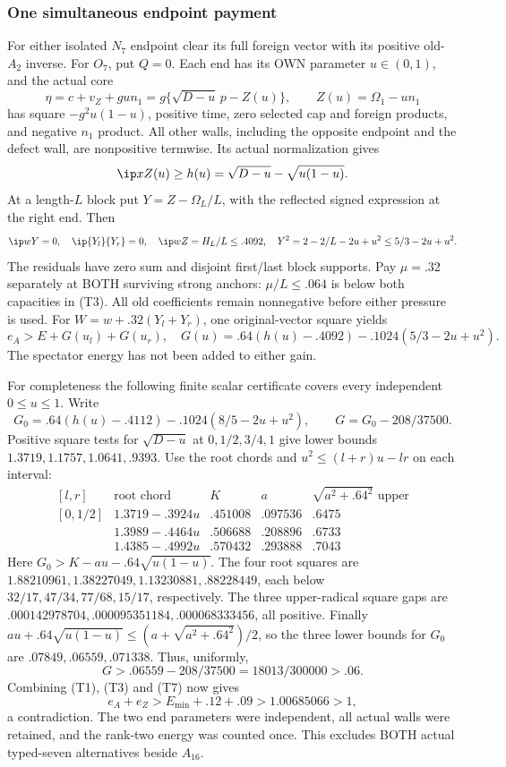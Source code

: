 \subsubsection{One simultaneous endpoint payment}
For either isolated \(N_7\) endpoint clear its full foreign vector
with its positive old-\(A_2\) inverse.  For \(O_7\), put \(Q=0\).
Each end has its OWN parameter \(u\in(0,1)\), and the actual core
\[
 \eta=c+v_Z+gu n_1
 =g\{\sqrt{D-u}\,p-Z(u)\},\qquad Z(u)=\Omega_1-u n_1
\]
has square \(-g^2u(1-u)\), positive time, zero selected cap and
foreign products, and negative \(n_1\) product.  All other walls,
including the opposite endpoint and the defect wall, are nonpositive
termwise.  Its actual normalization gives
\[
 \ip x{Z(u)}\ge h(u)=\sqrt{D-u}-\sqrt{u(1-u)}.
\]
At a length-\(L\) block put \(Y=Z-\Omega_L/L\), with the
reflected signed expression at the right end.  Then
\[
 \ip wY=0,\quad \ip{Y_l}{Y_r}=0,\quad
 \ip wZ=H_L/L\le.4092,\quad
 Y^2=2-2/L-2u+u^2\le5/3-2u+u^2.
\]
The residuals have zero sum and disjoint first/last block supports.
Pay \(\mu=.32\) separately at BOTH surviving strong anchors:
\(\mu/L\le.064\) is below both capacities in (T3).
All old coefficients remain nonnegative before either pressure is used.
For \(W=w+.32(Y_l+Y_r)\), one original-vector square yields
\[
 e_A>E+G(u_l)+G(u_r),\quad
 G(u)=.64(h(u)-.4092)-.1024(5/3-2u+u^2).            \tag{T7}
\]
The spectator energy has not been added to either gain.

For completeness the following finite scalar certificate covers every
independent \(0\le u\le1\).  Write
\[
 G_0=.64(h(u)-.4112)-.1024(8/5-2u+u^2),\qquad
 G=G_0-208/37500.
\]
Positive square tests for \(\sqrt{D-u}\) at \(0,1/2,3/4,1\)
give lower bounds \(1.3719,1.1757,1.0641,.9393\).
Use the root chords and \(u^2\le(l+r)u-lr\) on each interval:
\[
\begin{array}{c|c|c|c|c}
[l,r]&\text{root chord}&K&a&\sqrt{a^2+.64^2}\text{ upper}\\ \hline
[0,1/2]&1.3719-.3924u&.451008&.097536&.6475\\
[1/2,3/4]&1.3989-.4464u&.506688&.208896&.6733\\
[3/4,1]&1.4385-.4992u&.570432&.293888&.7043
\end{array}
\]
Here \(G_0>K-au-.64\sqrt{u(1-u)}\).
The four root squares are
\(1.88210961,1.38227049,1.13230881,.88228449\),
each below \(32/17,47/34,77/68,15/17\), respectively.
The three upper-radical square gaps are
\(.000142978704,.000095351184,.000068333456\), all positive.
Finally
\(au+.64\sqrt{u(1-u)}\le(a+\sqrt{a^2+.64^2})/2\),
so the three lower bounds for \(G_0\) are
\(.07849,.06559,.071338\).  Thus, uniformly,
\[
               G>.06559-208/37500=18013/300000>.06.
\]
Combining (T1), (T3) and (T7) now gives
\[
 e_A+e_Z>E_{\min}+.12+.09>1.00685066>1,
\]
a contradiction.  The two end parameters were independent, all actual
walls were retained, and the rank-two energy was counted once.
This excludes BOTH actual typed-seven alternatives beside \(A_{16}\).

